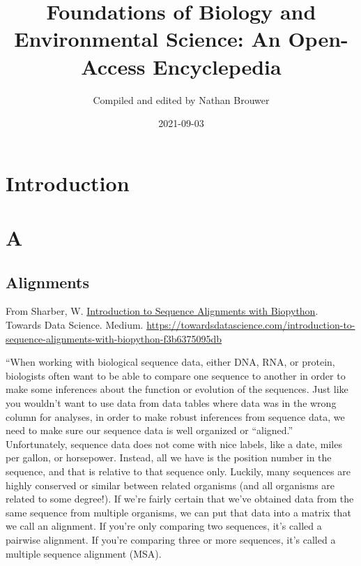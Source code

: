 \documentclass[
]{book}
\title{Foundations of Biology and Environmental Science: An Open-Access Encyclepedia}
\author{Compiled and edited by Nathan Brouwer}
\date{2021-09-03}
\begin{document}
\maketitle

{
\setcounter{tocdepth}{1}
\tableofcontents
}
\hypertarget{introduction}{%
\chapter{Introduction}\label{introduction}}

\hypertarget{a}{%
\chapter{A}\label{a}}

\hypertarget{alignments}{%
\section{Alignments}\label{alignments}}

From Sharber, W. \href{https://towardsdatascience.com/introduction-to-sequence-alignments-with-biopython-f3b6375095db}{Introduction to Sequence Alignments with Biopython}. Towards Data Science. Medium.
\url{https://towardsdatascience.com/introduction-to-sequence-alignments-with-biopython-f3b6375095db}

``When working with biological sequence data, either DNA, RNA, or protein, biologists often want to be able to compare one sequence to another in order to make some inferences about the function or evolution of the sequences. Just like you wouldn't want to use data from data tables where data was in the wrong column for analyses, in order to make robust inferences from sequence data, we need to make sure our sequence data is well organized or ``aligned.'' Unfortunately, sequence data does not come with nice labels, like a date, miles per gallon, or horsepower. Instead, all we have is the position number in the sequence, and that is relative to that sequence only. Luckily, many sequences are highly conserved or similar between related organisms (and all organisms are related to some degree!). If we're fairly certain that we've obtained data from the same sequence from multiple organisms, we can put that data into a matrix that we call an alignment. If you're only comparing two sequences, it's called a pairwise alignment. If you're comparing three or more sequences, it's called a multiple sequence alignment (MSA).
\end{document}
